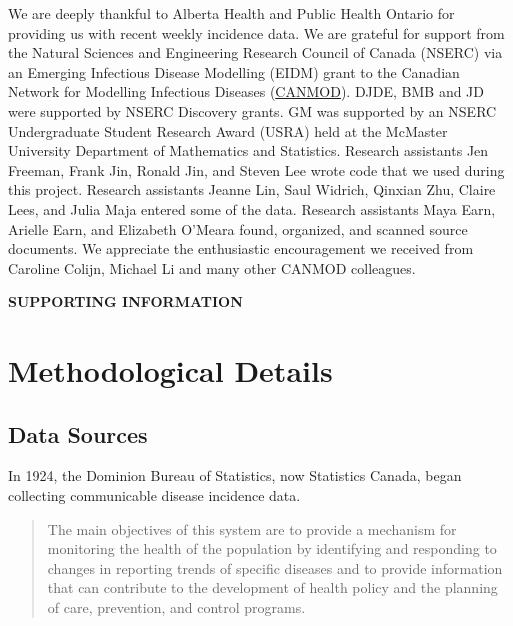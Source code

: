 \documentclass[12pt]{article}
\begin{document}
We are deeply thankful to Alberta Health and Public Health Ontario for providing us with recent weekly incidence data. We are grateful for support from the Natural Sciences and Engineering Research Council of Canada (NSERC) via an Emerging Infectious Disease Modelling (EIDM) grant to the Canadian Network for Modelling Infectious Diseases (\href{https://canmod.net}{CANMOD}). DJDE, BMB and JD were supported by NSERC Discovery grants. GM was supported by an NSERC Undergraduate Student Research Award (USRA) held at the McMaster University Department of Mathematics and Statistics. Research assistants Jen Freeman, Frank Jin, Ronald Jin, and Steven Lee wrote code that we used during this project. Research assistants Jeanne Lin, Saul Widrich, Qinxian Zhu, Claire Lees, and Julia Maja entered some of the data. Research assistants Maya Earn, Arielle Earn, and Elizabeth O'Meara found, organized, and scanned source documents.  We appreciate the enthusiastic encouragement we received from Caroline Colijn, Michael Li and many other CANMOD colleagues.




\newpage

\appendix
\setcounter{page}{1}
\setcounter{figure}{0}
\appendix

\renewcommand{\thepage}{S\arabic{page}}
\renewcommand{\thefigure}{S\arabic{figure}}
\renewcommand{\thesection}{S\arabic{section}}

\centerline{\Huge\bfseries SUPPORTING INFORMATION}

\section{Methodological Details}\label{sec:appendix-methods}

\subsection{Data Sources}\label{sec:appendix-data-sources}

In 1924, the Dominion Bureau of Statistics, now Statistics Canada, began collecting communicable disease incidence data.

\begin{quote}
The main objectives of this system are to provide a mechanism for monitoring the health of the population by identifying and responding to changes in reporting trends of specific diseases and to provide information that can contribute to the development of health policy and the planning of care, prevention, and control programs. \cite{sockett1996communicable}
\end{quote}
\end{document}
